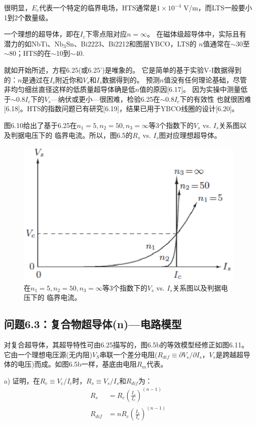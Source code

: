 很明显，$E_c$代表一个特定的临界电场，HTS通常是$1\times 10^{-4}$ V/m，而LTS一般要小1到2个数量级。

一个理想的超导体，即在$I_c$下零点阻对应$n=\infty$。
在磁体级超导体中，实际且有潜力的如NbTi、$\mathrm{Nb_3 Sn}$、Bi2223、Bi2212和图层YBCO，LTS的
$n$值通常在$\sim$30至$\sim$80；HTS的在$\sim$10到$\sim$40.

就如开始所述，方程6.25(或6.25')是唯象的。
它是简单的基于实验V-I数据得到的：$n$是通过在$I_s$附近你和$V_s$和$I_s$数据得到的。
预测$n$值没有任何理论基础，尽管非均匀细丝直径这样的低质量超导体确是低$n$值的原因[6.17]。
因为实操中测量低于$\sim 0.8 I_c$下的$V_s$---纳伏或更小---很困难，检验6.25在$\sim 0.8 I_c$下的有效性
也就很困难[6.18]。HTS的指数问题已有研究[6.19]，结果已用于YBCO线圈的设计[6.20]。

图6.10给出了基于6.25在$n_1=5,n_2=50,n_3=\infty$等3个指数下的$V_s$ vs. $I_s$关系图以及判据电压下的
临界电流。所以，图6.5的$R_s$ vs. $I_s$图对应理想超导体。
\begin{figure}[htbp]
	\centering
	\includegraphics[scale=0.7]{chpt6/figs/fig6.10.eps}
	\caption{在$n_1=5,n_2=50,n_3=\infty$等3个指数下的$V_s$ vs. $I_s$关系图以及判据电压下的
		临界电流。}
\end{figure}

\subsection{问题6.3：复合物超导体(n)---电路模型}
对复合超导体，其超导特性可由6.25描写的，图6.5b的等效模型经修正如图6.11。
它由一个理想电压源(无内阻)$V_S$串联一个差分电阻($R_{dif}\equiv \partial V_s/\partial I_s$，$V_s$是跨越超导体的电压)而成。如图6.5b一样，基底由电阻$R_m$代表。

a) 证明，在$R_c\equiv V_c/I_c$时，$R_s\equiv V_s/I_s$和$R_{dif}$为：
\begin{subequations}
	\begin{align}
	R_s&=R_c(\frac{I_s}{I_c})^{(n-1)}\\
	R_{dif}&=nR_c(\frac{I_s}{I_c})^{(n-1)}
	\end{align}
\end{subequations}

